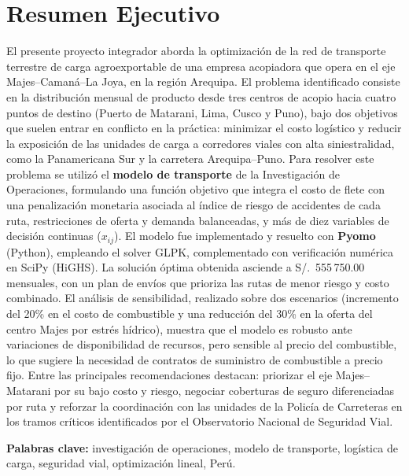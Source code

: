 \documentclass[11pt,a4paper]{article}
\begin{document}
\section*{Resumen Ejecutivo}
El presente proyecto integrador aborda la optimizaci\'on de la red de transporte terrestre de carga agroexportable de una empresa acopiadora que opera en el eje Majes--Cama\-n\'a--La Joya, en la regi\'on Arequipa. El problema identificado consiste en la distribuci\'on mensual de producto desde tres centros de acopio hacia cuatro puntos de destino (Puerto de Matarani, Lima, Cusco y Puno), bajo dos objetivos que suelen entrar en conflicto en la pr\'actica: minimizar el costo log\'istico y reducir la exposici\'on de las unidades de carga a corredores viales con alta siniestralidad, como la Panamericana Sur y la carretera Arequipa--Puno. Para resolver este problema se utiliz\'o el \textbf{modelo de transporte} de la Investigaci\'on de Operaciones, formulando una funci\'on objetivo que integra el costo de flete con una penalizaci\'on monetaria asociada al \'indice de riesgo de accidentes de cada ruta, restricciones de oferta y demanda balanceadas, y m\'as de diez variables de decisi\'on continuas ($x_{ij}$). El modelo fue implementado y resuelto con \textbf{Pyomo} (Python), empleando el solver GLPK, complementado con verificaci\'on num\'erica en SciPy (HiGHS). La soluci\'on \'optima obtenida asciende a S/.\ 555\,750.00 mensuales, con un plan de env\'ios que prioriza las rutas de menor riesgo y costo combinado. El an\'alisis de sensibilidad, realizado sobre dos escenarios (incremento del 20\% en el costo de combustible y una reducci\'on del 30\% en la oferta del centro Majes por estr\'es h\'idrico), muestra que el modelo es robusto ante variaciones de disponibilidad de recursos, pero sensible al precio del combustible, lo que sugiere la necesidad de contratos de suministro de combustible a precio fijo. Entre las principales recomendaciones destacan: priorizar el eje Majes--Matarani por su bajo costo y riesgo, negociar coberturas de seguro diferenciadas por ruta y reforzar la coordinaci\'on con las unidades de la Polic\'ia de Carreteras en los tramos cr\'iticos identificados por el Observatorio Nacional de Seguridad Vial.

\vspace{0.3cm}
\noindent\textbf{Palabras clave:} investigaci\'on de operaciones, modelo de transporte, log\'istica de carga, seguridad vial, optimizaci\'on lineal, Per\'u.
\end{document}

